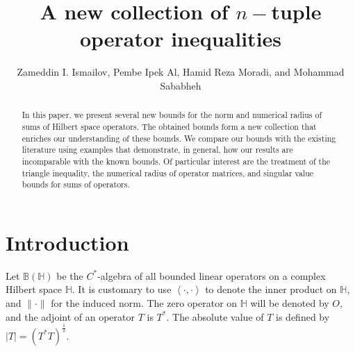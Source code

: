 \documentclass[12pt,twoside,reqno]{amsart}
\numberwithin{equation}{section}
\begin{document}
\title{A new collection of $n-$tuple operator inequalities}
\author{Zameddin I. Ismailov, Pembe Ipek Al, Hamid Reza Moradi, and Mohammad Sababheh}

\begin{abstract}
In this paper, we present several new bounds for the norm and numerical radius of sums of Hilbert space operators. The obtained bounds form a new collection that enriches our understanding of these bounds. We compare our bounds with the existing literature using examples that demonstrate, in general, how our results are incomparable with the known bounds. Of particular interest are the treatment of the triangle inequality, the numerical radius of operator matrices, and singular value bounds for sums of operators.
\end{abstract}

\maketitle

\pagestyle{myheadings} \markboth{\centerline{}}
{\centerline{}} \bigskip \bigskip 

\section{Introduction}
Let $\mathbb{B}(\mathbb{H})$ be the $C^*$-algebra of all bounded linear operators on a complex Hilbert space $\mathbb{H}$. It is customary to use $\left<\cdot,\cdot\right>$ to denote the inner product on $\mathbb{H}$, and $\|\cdot\|$ for the induced norm. The zero operator on $\mathbb{H}$ will be denoted by $O$, and the adjoint of an operator $T$ is $T^*$. The  absolute value of $T$ is defined by $|T|=(T^*T)^{
\frac{1}{2}}.$ 
\end{document}
